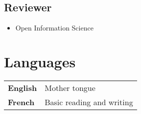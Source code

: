 \documentclass[11pt, a4paper]{article}
\newcommand{\TablePad}{\vspace{-0.4cm}}
\begin{document}
\subsection{Reviewer}

\begin{itemize}
  \item Open Information Science
\end{itemize}

\section{Languages}



\TablePad
\begin{tabularx}{\textwidth}{@{}p{} p{}@{}}
  \textbf{English} & Mother tongue
  \\
  \textbf{French} & Basic reading and writing
\end{tabularx}
\end{document}
